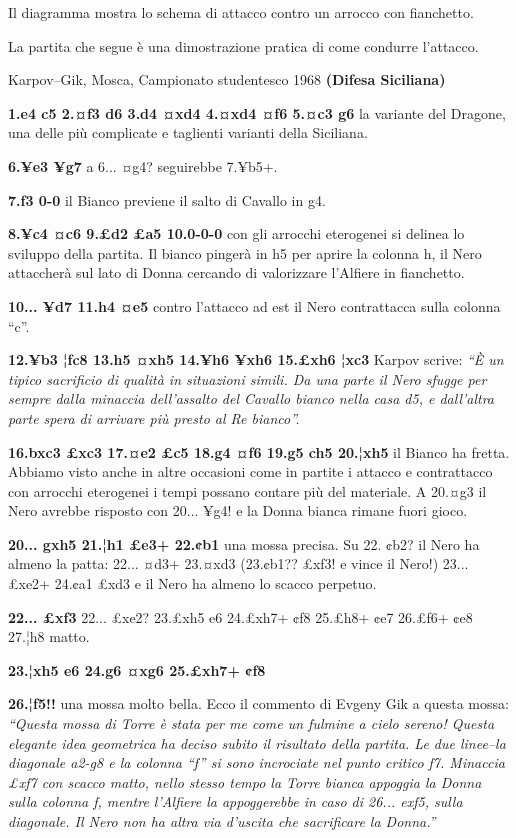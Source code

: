 
Il diagramma mostra lo schema di attacco contro un arrocco con
fianchetto.

La partita che segue è una dimostrazione pratica di come condurre
l'attacco.

Karpov--Gik, Mosca, Campionato studentesco 1968 \textbf{(Difesa
Siciliana)}

\textbf{1.e4 c5 2.¤f3 d6 3.d4 ¤xd4 4.¤xd4 ¤f6 5.¤c3 g6} la variante del
Dragone, una delle più complicate e taglienti varianti della Siciliana.

\textbf{6.¥e3 ¥g7} a 6... ¤g4? seguirebbe 7.¥b5+.

\textbf{7.f3 0-0} il Bianco previene il salto di Cavallo in g4.

\textbf{8.¥c4 ¤c6 9.£d2 £a5 10.0-0-0} con gli arrocchi eterogenei si
delinea lo sviluppo della partita. Il bianco pingerà in h5 per aprire la
colonna h, il Nero attaccherà sul lato di Donna cercando di valorizzare
l'Alfiere in fianchetto.

\textbf{10... ¥d7 11.h4 ¤e5} contro l'attacco ad est il Nero
contrattacca sulla colonna ``c''.

\textbf{12.¥b3 ¦fc8 13.h5 ¤xh5 14.¥h6 ¥xh6 15.£xh6 ¦xc3} Karpov scrive:
\emph{``È un tipico sacrificio di qualità in situazioni simili. Da una
parte il Nero sfugge per sempre dalla minaccia dell'assalto del Cavallo
bianco nella casa d5, e dall'altra parte spera di arrivare più presto al
Re bianco''.}

\textbf{16.bxc3 £xc3 17.¤e2 £c5 18.g4 ¤f6 19.g5 ch5 20.¦xh5} il Bianco
ha fretta. Abbiamo visto anche in altre occasioni come in partite i
attacco e contrattacco con arrocchi eterogenei i tempi possano contare
più del materiale. A 20.¤g3 il Nero avrebbe risposto con 20... ¥g4! e la
Donna bianca rimane fuori gioco.

\textbf{20... gxh5 21.¦h1 £e3+ 22.¢b1} una mossa precisa. Su 22. ¢b2? il
Nero ha almeno la patta: 22... ¤d3+ 23.¤xd3 (23.¢b1?? £xf3! e vince il
Nero!) 23... £xe2+ 24.¢a1 £xd3 e il Nero ha almeno lo scacco perpetuo.

\textbf{22... £xf3} 22... £xe2? 23.£xh5 e6 24.£xh7+ ¢f8 25.£h8+ ¢e7
26.£f6+ ¢e8 27.¦h8 matto.

\textbf{23.¦xh5 e6 24.g6 ¤xg6 25.£xh7+ ¢f8}


\textbf{26.¦f5!!} una mossa molto bella. Ecco il commento di Evgeny Gik
a questa mossa: \emph{``Questa mossa di Torre è stata per me come un
fulmine a cielo sereno! Questa elegante idea geometrica ha deciso subito
il risultato della partita. Le due linee--la diagonale a2-g8 e la
colonna ``f'' si sono incrociate nel punto critico f7. Minaccia £xf7 con
scacco matto, nello stesso tempo la Torre bianca appoggia la Donna sulla
colonna f, mentre l'Alfiere la appoggerebbe in caso di 26... exf5, sulla
diagonale. Il Nero non ha altra via d'uscita che sacrificare la
Donna.''}


